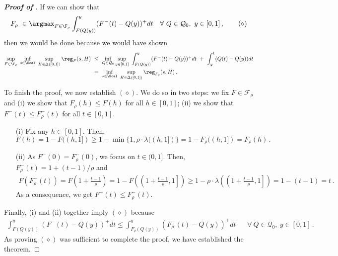 \begin{proof}[\textbf{Proof of }]
	If we can show that
	\begin{align*}
		F_\rho\ \in \argmax_{F \in \F_\rho} \int_{F(Q(y))}^y (F^-(t) - Q(y))^+ dt &&\forall\ Q\in \mathcal{Q}_0,\ y\in [0,1]\,, \tag{$\diamond$}
	\end{align*}
	then we would be done because we would have shown
	\begin{align*}
		\sup_{F \in \F_\rho}\ \inf_{s \in \Scal}\ \sup_{H \in \Delta([0,1])} \reg_F(s,H)\ &\leq\ \inf_{Q\in \mathcal Q_0}\sup_{y \in [0,1]}\   \int_{F(Q(y))}^y (F^-(t) - Q(y))^+ dt\ +\ \int_y^1 (Q(t) - Q(y)) dt\\
		&=\ \inf_{s \in \Scal}\ \sup_{H \in \Delta([0,1])} \reg_{F_{\rho}}(s,H)\,.
	\end{align*}
	
	To finish the proof, we now establish $(\diamond)$. We do so in two steps: we fix $F \in \mathcal{F}_{\rho}$ and (i) we show that $F_\rho(h) \leq F(h)$ for all $h \in [0,1]$; (ii)  we show that $F^-(t) \leq F_\rho^-(t)$ for all $t \in [0,1]$.
	\begin{itemize}
		\item[(i)] Fix any $h \in [0,1]$. Then, $$F(h) = 1 - F((h,1]) \geq 1 - \min\{1, \rho\cdot \lambda((h,1])\} = 1 - F_\rho((h, 1]) = F_\rho(h)\,.$$
		\item[(ii)] As $F^-(0) = F^-_\rho(0)$, we focus on $t \in (0,1]$. Then, $F_\rho^-(t) = 1 + (t-1)/\rho$ and 
		\begin{align*}
			F(F^-_\rho(t)) = F\left(1 + \frac{t-1}{\rho} \right) = 1 - F\left(\left(1 + \frac{t-1}{\rho}, 1\right] \right) \geq 1 - \rho \cdot \lambda\left(\left(1 + \frac{t-1}{\rho}, 1\right] \right) = 1- (t-1) = t\,.
		\end{align*}
		As a consequence, we get $F^-(t) \leq F_\rho^-(t)$.
	\end{itemize}
	
	Finally, (i) and (ii) together imply $(\diamond)$ because
	\begin{align*}
		\int_{F(Q(y))}^y (F^-(t) - Q(y))^+ dt \leq \int_{F_\rho(Q(y))}^y (F_\rho^-(t) - Q(y))^+ dt &&\forall\ Q\in \mathcal{Q}_0,\ y\in [0,1]\,.
	\end{align*}  
	As proving $(\diamond)$ was sufficient to complete the proof, we have established the theorem.
\end{proof}